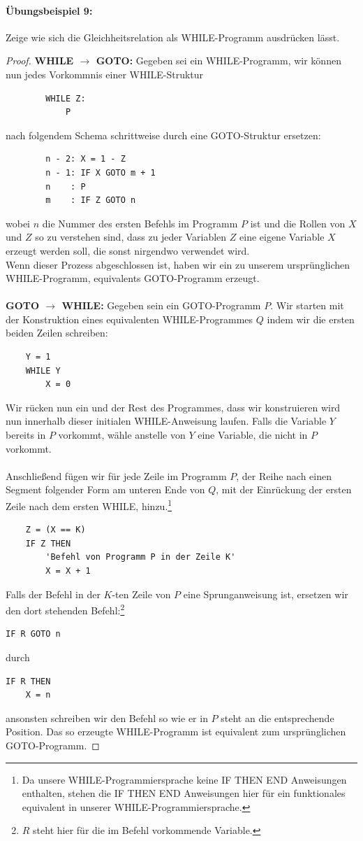 \documentclass[11pt,a4paper,leqno]{report}
\numberwithin{equation}{chapter}
\begin{document}
\paragraph{\"Ubungsbeispiel 9:} Zeige wie sich die Gleichheitsrelation als WHILE-Programm ausdr\"ucken l\"asst.
\begin{proof}
\textbf{WHILE $\rightarrow$ GOTO:} Gegeben sei ein WHILE-Programm, wir k\"onnen nun jedes Vorkommnis einer WHILE-Struktur
\begin{lstlisting}
		WHILE Z:
			P 
\end{lstlisting}
nach folgendem Schema schrittweise durch eine GOTO-Struktur ersetzen:
\begin{lstlisting}
		n - 2: X = 1 - Z
		n - 1: IF X GOTO m + 1
		n    : P
		m    : IF Z GOTO n
\end{lstlisting}
wobei $n$ die Nummer des ersten Befehls im Programm $P$ ist und die Rollen von $X$ und $Z$ so zu verstehen sind, dass zu jeder Variablen $Z$ eine eigene Variable $X$ erzeugt werden soll, die sonst nirgendwo verwendet wird.\\
Wenn dieser Prozess abgeschlossen ist, haben wir ein zu unserem urspr\"unglichen WHILE-Programm, equivalents GOTO-Programm erzeugt.
\\
\\
\textbf{GOTO $\rightarrow$ WHILE:} Gegeben sein ein GOTO-Programm $P$. Wir starten mit der Konstruktion eines equivalenten WHILE-Programmes $Q$ indem wir die ersten beiden Zeilen schreiben:
\begin{lstlisting}
	Y = 1
	WHILE Y
		X = 0
\end{lstlisting}
Wir r\"ucken nun ein und der Rest des Programmes, dass wir konstruieren wird nun innerhalb dieser initialen WHILE-Anweisung laufen. Falls die Variable $Y$ bereits in $P$ vorkommt, w\"ahle anstelle von $Y$ eine Variable, die nicht in $P$ vorkommt.\\
\\
Anschlie\ss{}end f\"ugen wir f\"ur jede Zeile im Programm $P$, der Reihe nach einen Segment folgender Form am unteren Ende von $Q$, mit der Einr\"uckung der ersten Zeile nach dem ersten WHILE, hinzu.\footnote{Da unsere WHILE-Programmiersprache keine IF THEN END Anweisungen enthalten, stehen die IF THEN END Anweisungen hier f\"ur ein funktionales equivalent in unserer WHILE-Programmiersprache.}
\begin{lstlisting}
	Z = (X == K)
	IF Z THEN
		'Befehl von Programm P in der Zeile K'
		X = X + 1
\end{lstlisting}
Falls der Befehl in der $K$-ten Zeile von $P$ eine Sprunganweisung ist, ersetzen wir den dort stehenden Befehl:\footnote{$R$ steht hier f\"ur die im Befehl vorkommende Variable.}
\begin{lstlisting}
IF R GOTO n
\end{lstlisting}
durch
\begin{lstlisting}
IF R THEN
	X = n
\end{lstlisting}
ansonsten schreiben wir den Befehl so wie er in $P$ steht an die entsprechende Position. Das so erzeugte WHILE-Programm ist equivalent zum urspr\"unglichen GOTO-Programm.
\end{proof}
\end{document}
